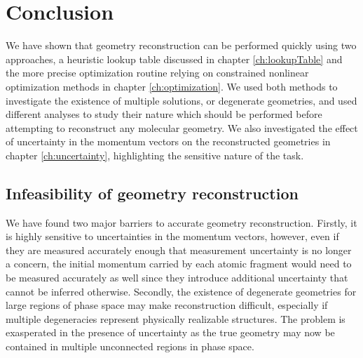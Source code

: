 \chapter{Conclusion}\label{ch:conclusion}


We have shown that geometry reconstruction can be performed quickly using two approaches, a heuristic lookup table discussed in chapter \ref{ch:lookupTable} and the more precise optimization routine relying on constrained nonlinear optimization methods in chapter \ref{ch:optimization}. We used both methods to investigate the existence of multiple solutions, or degenerate geometries, and used different analyses to study their nature which should be performed before attempting to reconstruct any molecular geometry. We also investigated the effect of uncertainty in the momentum vectors on the reconstructed geometries in chapter \ref{ch:uncertainty}, highlighting the sensitive nature of the task.

\section*{Infeasibility of geometry reconstruction}
We have found two major barriers to accurate geometry reconstruction. Firstly, it is highly sensitive to uncertainties in the momentum vectors, however, even if they are measured accurately enough that measurement uncertainty is no longer a concern, the initial momentum carried by each atomic fragment would need to be measured accurately as well since they introduce additional uncertainty that cannot be inferred otherwise. Secondly, the existence of degenerate geometries for large regions of phase space may make reconstruction difficult, especially if multiple degeneracies represent physically realizable structures. The problem is exasperated in the presence of uncertainty as the true geometry may now be contained in multiple unconnected regions in phase space.

